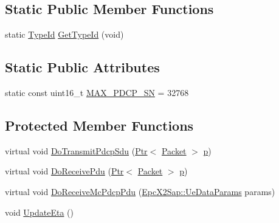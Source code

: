 \subsection*{Static Public Member Functions}
\begin{DoxyCompactItemize}
\item 
static \hyperlink{classns3_1_1TypeId}{Type\+Id} \hyperlink{classns3_1_1McEnbPdcp_adee0ed06c49e4fd620acdb097b595558}{Get\+Type\+Id} (void)
\end{DoxyCompactItemize}
\subsection*{Static Public Attributes}
\begin{DoxyCompactItemize}
\item 
static const uint16\+\_\+t \hyperlink{classns3_1_1McEnbPdcp_a052ac8c1766c1c036a14a586ba228790}{M\+A\+X\+\_\+\+P\+D\+C\+P\+\_\+\+SN} = 32768
\end{DoxyCompactItemize}
\subsection*{Protected Member Functions}
\begin{DoxyCompactItemize}
\item 
virtual void \hyperlink{classns3_1_1McEnbPdcp_a92e0b045ec5f5d0c8316a2b36166cba4}{Do\+Transmit\+Pdcp\+Sdu} (\hyperlink{classns3_1_1Ptr}{Ptr}$<$ \hyperlink{classns3_1_1Packet}{Packet} $>$ \hyperlink{lte__link__budget__x2__handover__measures_8m_ac9de518908a968428863f829398a4e62}{p})
\item 
virtual void \hyperlink{classns3_1_1McEnbPdcp_a244a5eff95cef39b7319af03bfbac89d}{Do\+Receive\+Pdu} (\hyperlink{classns3_1_1Ptr}{Ptr}$<$ \hyperlink{classns3_1_1Packet}{Packet} $>$ \hyperlink{lte__link__budget__x2__handover__measures_8m_ac9de518908a968428863f829398a4e62}{p})
\item 
virtual void \hyperlink{classns3_1_1McEnbPdcp_a5b9c606adc1cfce67ea26d07120ce8a3}{Do\+Receive\+Mc\+Pdcp\+Pdu} (\hyperlink{structns3_1_1EpcX2Sap_1_1UeDataParams}{Epc\+X2\+Sap\+::\+Ue\+Data\+Params} params)
\item 
void \hyperlink{classns3_1_1McEnbPdcp_a1e9a1afd4aedb3527169d3de52098861}{Update\+Eta} ()
\end{DoxyCompactItemize}

